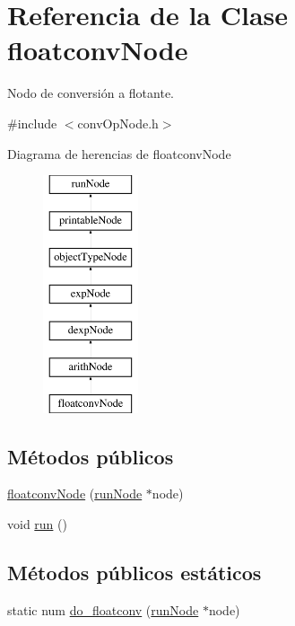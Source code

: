 \hypertarget{classfloatconvNode}{\section{Referencia de la Clase floatconv\-Node}
\label{classfloatconvNode}
}


Nodo de conversión a flotante.  




{\ttfamily \#include $<$conv\-Op\-Node.\-h$>$}

Diagrama de herencias de floatconv\-Node\begin{figure}[H]
\begin{center}
\leavevmode
\includegraphics[height=7.000000cm]{classfloatconvNode}
\end{center}
\end{figure}
\subsection*{Métodos públicos}
\begin{DoxyCompactItemize}
\item 
\hyperlink{classfloatconvNode_a0de7468218b7634c7fabcd4bebdb3e60}{floatconv\-Node} (\hyperlink{classrunNode}{run\-Node} $\ast$node)
\item 
void \hyperlink{classfloatconvNode_ae4ffda78f5fa50df0cbf21f7eb1b1572}{run} ()
\end{DoxyCompactItemize}
\subsection*{Métodos públicos estáticos}
\begin{DoxyCompactItemize}
\item 
static num \hyperlink{classfloatconvNode_a32fa0d9657a4be471d7ca5920344fde4}{do\-\_\-floatconv} (\hyperlink{classrunNode}{run\-Node} $\ast$node)
\end{DoxyCompactItemize}
